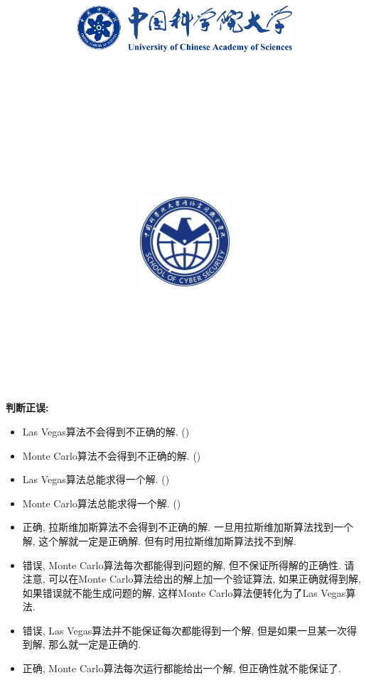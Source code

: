 \documentclass{article}
\title{
	\includegraphics[width=0.6\textwidth]{images/title/ucas_logo 1.pdf}\\
    \vspace{1in}
    \textmd{\textbf{\hmwkClass}}\\
	\textmd{\Large{\textbf{\hmwkClassID}}}\\
    \textmd{\textbf{\hmwkTitle}}\\
    \normalsize\vspace{0.1in}\large{\hmwkCompleteTime }\\
    \vspace{0.1in}\large{\textit{\hmwkClassInstructor\ }}\\
    \vspace{1in}
	\includegraphics[width=0.25\textwidth]{images/title/Cyber.jpg}\\
	\vspace{1in}
}
\author{
	\hmwkAuthorName \\ 
	\hmwkAuthorStuID \\
	\hmwkAuthorInst \\
	\hmwkAuthorzhuanye \\
	\hmwkAuthorfangxiang
	}
\date{}
\begin{document}
\maketitle


%
%
%
%
%


\pagebreak



\begin{homeworkProblem}
	\textbf{判断正误:}
	\begin{itemize}
		\item Las Vegas算法不会得到不正确的解. (\quad )
		\item Monte Carlo算法不会得到不正确的解. (\quad )
		\item Las Vegas算法总能求得一个解. (\quad)
		\item Monte Carlo算法总能求得一个解. (\quad)
	\end{itemize}
	\solution 
	\begin{itemize}
		\item 正确, 拉斯维加斯算法不会得到不正确的解. 一旦用拉斯维加斯算法找到一个解, 这个解就一定是正确解. 但有时用拉斯维加斯算法找不到解.
		\item 错误, Monte Carlo算法每次都能得到问题的解, 但不保证所得解的正确性. 请注意, 可以在Monte Carlo算法给出的解上加一个验证算法, 如果正确就得到解, 如果错误就不能生成问题的解, 这样Monte Carlo算法便转化为了Las Vegas算法.
		\item 错误, Las Vegas算法并不能保证每次都能得到一个解, 但是如果一旦某一次得到解, 那么就一定是正确的.
		\item 正确, Monte Carlo算法每次运行都能给出一个解, 但正确性就不能保证了.
	\end{itemize}
\end{homeworkProblem}
\end{document}
